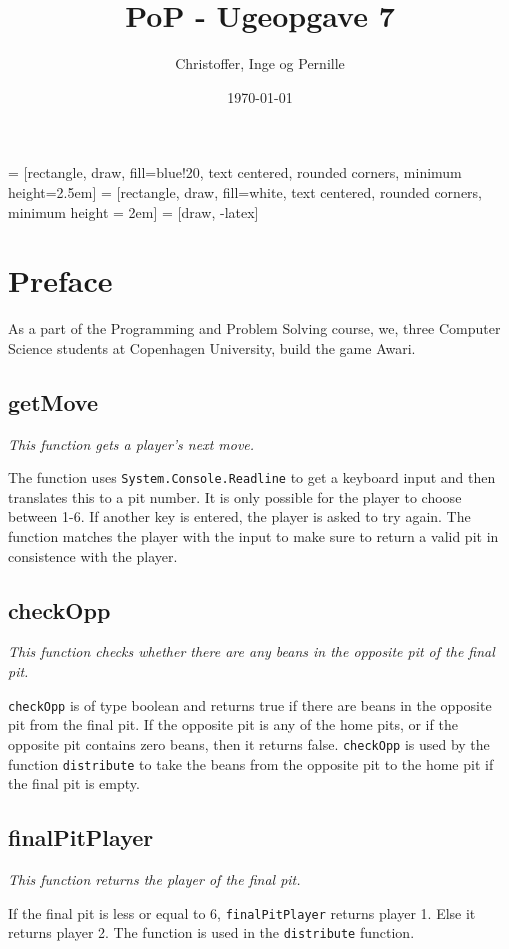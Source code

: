 \documentclass{report}
\title{PoP - Ugeopgave 7}
\author{Christoffer, Inge og Pernille}
\date{\today}
\begin{document}
\maketitle
{} = [rectangle, draw, fill=blue!20, text centered,
    rounded corners, minimum height=2.5em]
 = [rectangle, draw, fill=white, text centered,
    rounded corners, minimum height = 2em]
 = [draw, -latex]

\section*{Preface}
As a part of the Programming and Problem Solving course, we,
three Computer Science students at Copenhagen University, build the game Awari.



\subsection*{getMove}
{\it This function gets a player's next move.}

The function uses \texttt{System.Console.Readline} to get a keyboard input and then translates this to a pit number. It is only possible for the player to choose between 1-6. If another key is entered, the player is asked to try again. The function matches the player with the input to make sure to return a valid pit in consistence with the player.
\\

\subsection*{checkOpp}
{\it This function checks whether there are any beans in the opposite pit of the final pit.}

\texttt{checkOpp} is of type boolean and returns true if there are beans in the opposite pit from the final pit. If the opposite pit is any of the home pits, or if the opposite pit contains zero beans, then it returns false. \texttt{checkOpp} is used by the function \texttt{distribute} to take the beans from the opposite pit to the home pit if the final pit is empty.

\subsection*{finalPitPlayer}
{\it This function returns the player of the final pit.}

If the final pit is less or equal to 6, \texttt{finalPitPlayer} returns player 1. Else it returns player 2. The function is used in the \texttt{distribute} function.
\end{document}
